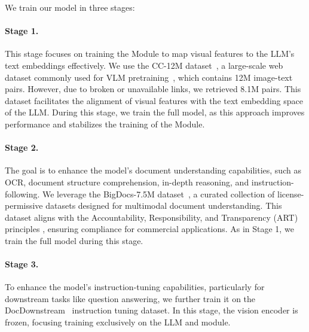 We train our model in three stages:
\paragraph{Stage 1.} This stage focuses on training the \alignmodule{}  Module to map visual features to the LLM's text embeddings effectively. We use the CC-12M dataset~\cite{cc12m}, a large-scale web dataset commonly used for VLM pretraining~\cite{liu2023llava}, which contains 12M image-text pairs. However, due to broken or unavailable links, we retrieved 8.1M pairs. This dataset facilitates the alignment of visual features with the text embedding space of the LLM. During this stage, we train the full model, as this approach improves performance and stabilizes the training of the \alignmodule{} Module.

\paragraph{Stage 2.} The goal is to enhance the model's document understanding capabilities, such as OCR, document structure comprehension, in-depth reasoning, and instruction-following. We leverage the BigDocs-7.5M dataset~\cite{bigdocs}, a curated collection of license-permissive datasets designed for multimodal document understanding. This dataset aligns with the Accountability, Responsibility, and Transparency (ART) principles \cite{bommasani2023foundationmodeltransparencyindex, caitlin2021}, ensuring compliance for commercial applications.
As in Stage 1, we train the full model during this stage.

\paragraph{Stage 3.} To enhance the model's instruction-tuning capabilities, particularly for downstream tasks like question answering, we further train it on the DocDownstream~\cite{bigdocs, hu2024mplugdocowl15unifiedstructure} instruction tuning dataset. In this stage, the vision encoder is frozen, focusing training exclusively on the LLM and \alignmodule{} module.
